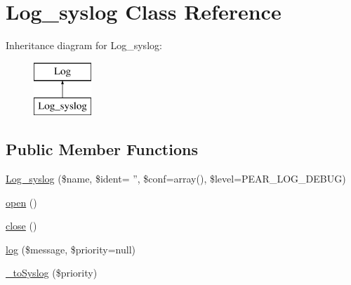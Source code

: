 \hypertarget{class_log__syslog}{
\section{Log\_\-syslog Class Reference}
\label{class_log__syslog}
}
Inheritance diagram for Log\_\-syslog:\begin{figure}[H]
\begin{center}
\leavevmode
\includegraphics[height=2.000000cm]{class_log__syslog}
\end{center}
\end{figure}
\subsection*{Public Member Functions}
\begin{DoxyCompactItemize}
\item 
\hyperlink{class_log__syslog_ac26b5b4b4dcfdd9d01272a1b1e110f67}{Log\_\-syslog} (\$name, \$ident= '', \$conf=array(), \$level=PEAR\_\-LOG\_\-DEBUG)
\item 
\hyperlink{class_log__syslog_a44a2ac59a3b91f8c18905dce700934d6}{open} ()
\item 
\hyperlink{class_log__syslog_aa69c8bf1f1dcf4e72552efff1fe3e87e}{close} ()
\item 
\hyperlink{class_log__syslog_ac3758dfa38a67df158a446847cf06413}{log} (\$message, \$priority=null)
\item 
\hyperlink{class_log__syslog_a323d6a4c485bde666c56b68cbb015ffc}{\_\-toSyslog} (\$priority)
\end{DoxyCompactItemize}
